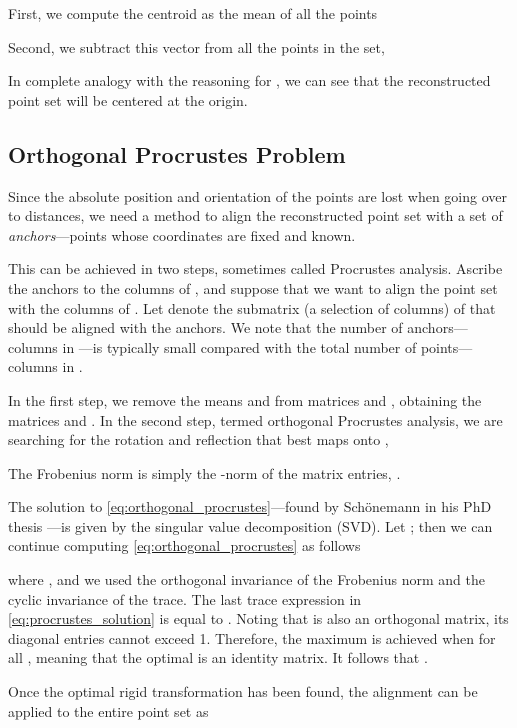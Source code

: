 \documentclass[10pt,double]{IEEEtran}
\newcommand{\rev}[1]{{#1}}
\begin{document}
First, we compute the centroid as the mean of all the points

Second, we subtract this vector from all the points in the set,

In complete analogy with the reasoning for , we can see that the
reconstructed point set will be centered at the origin.


\subsection{Orthogonal Procrustes Problem}

Since the absolute position and orientation of the points are lost when going
over to distances, we need a method to align the reconstructed point set with
a set of \emph{anchors}---points whose coordinates are fixed and known.

This can be achieved in two steps, sometimes called Procrustes analysis.
Ascribe the anchors to the columns of , and suppose that we want to align
the point set  with the columns of . \rev{Let  denote the
submatrix (a selection of columns) of  that should be aligned with the
anchors. We note that the number of anchors---columns in ---is typically
small compared with the total number of points---columns in .}

In the first step, we remove the means  and  from matrices
 and , obtaining the matrices  and
. In the second step, termed orthogonal Procrustes analysis,
we are searching for the rotation and reflection that best maps
 onto ,


\rev{The Frobenius norm  is simply the -norm of
the matrix entries, . 

The solution to
\eqref{eq:orthogonal_procrustes}---found by Sch\"onemann in his PhD thesis
\cite{Schonemann:1964tj}---is given by the singular value decomposition (SVD).
Let ; then we can continue computing
\eqref{eq:orthogonal_procrustes} as follows 


where , and we used the orthogonal invariance
of the Frobenius norm and the cyclic invariance of the trace. The
last trace expression in \eqref{eq:procrustes_solution} is equal to
. Noting that  is also an
orthogonal matrix, its diagonal entries cannot exceed 1. Therefore, the
maximum is achieved when  for all , meaning that the
optimal  is an identity matrix. It follows that . 

Once the optimal rigid transformation has been found, the alignment can be
applied to the entire point set as

}
\end{document}
